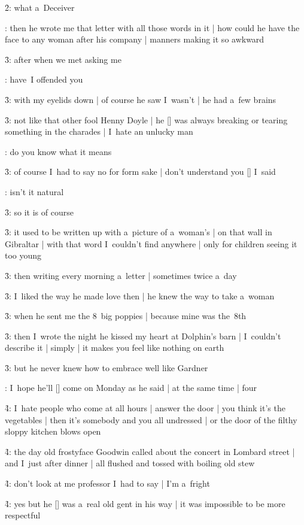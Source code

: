 \f2:
what a~Deceiver

:
then he wrote me that letter with all those words in it |
how could he have the face to any woman after his company |
manners making it so awkward

\f3:
after when we met
asking me

:
have~I offended you

\f3:
with my eyelids down |
of course he saw I~wasn't |
he had a~few brains

\f3:
not like that other fool Henny Doyle |
he [\henny] was always breaking or tearing something in the charades |
I~hate an unlucky man

:
do you know what it means

\f3:
of course I~had to say no for form sake |
don't understand you [\bloom] I~said

:
isn't it natural

\f3:
so it is of course

\f3:
it used to be written up with a~picture of a~woman's |
on that wall in Gibraltar |
with that word I~couldn't find anywhere |
only for children seeing it too young

\f3:
then writing every morning a~letter |
sometimes twice a~day

\f3:
I~liked the way he made love then |
he knew the way to take a~woman

\f3:
when he sent me the 8~big poppies |
because mine was the~8th

\f3:
then I~wrote the night he kissed my heart at Dolphin's barn |
I~couldn't describe it |
simply |
it makes you feel like nothing on earth

\f3:
but he never knew how to embrace well like Gardner

:
I~hope he'll [\boylan] come on Monday as he said |
at the same time |
four

\f4:
I~hate people who come at all hours |
answer the door |
you think it's the vegetables |
then it's somebody and you all undressed |
or the door of the filthy sloppy kitchen blows open

\f4:
the day old frostyface Goodwin called about the concert in Lombard street |
and I~just after dinner |
all flushed and tossed with boiling old stew

\f4:
don't look at me professor I~had to say |
I'm a~fright

\f4:
yes but he [\goodwin] was a~real old gent in his way |
it was impossible to be more respectful

